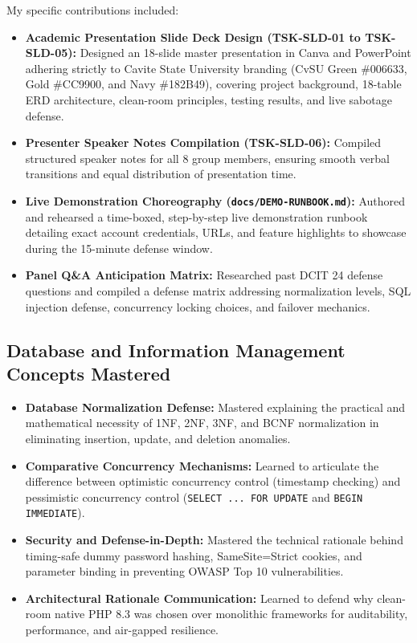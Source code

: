 My specific contributions included:
\begin{itemize}
    \item \textbf{Academic Presentation Slide Deck Design (TSK-SLD-01 to TSK-SLD-05):} Designed an 18-slide master presentation in Canva and PowerPoint adhering strictly to Cavite State University branding (CvSU Green \#006633, Gold \#CC9900, and Navy \#182B49), covering project background, 18-table ERD architecture, clean-room principles, testing results, and live sabotage defense.
    \item \textbf{Presenter Speaker Notes Compilation (TSK-SLD-06):} Compiled structured speaker notes for all 8 group members, ensuring smooth verbal transitions and equal distribution of presentation time.
    \item \textbf{Live Demonstration Choreography (\texttt{docs/DEMO-RUNBOOK.md}):} Authored and rehearsed a time-boxed, step-by-step live demonstration runbook detailing exact account credentials, URLs, and feature highlights to showcase during the 15-minute defense window.
    \item \textbf{Panel Q\&A Anticipation Matrix:} Researched past DCIT 24 defense questions and compiled a defense matrix addressing normalization levels, SQL injection defense, concurrency locking choices, and failover mechanics.
\end{itemize}

\subsection{Database and Information Management Concepts Mastered}
\begin{itemize}
    \item \textbf{Database Normalization Defense:} Mastered explaining the practical and mathematical necessity of 1NF, 2NF, 3NF, and BCNF normalization in eliminating insertion, update, and deletion anomalies.
    \item \textbf{Comparative Concurrency Mechanisms:} Learned to articulate the difference between optimistic concurrency control (timestamp checking) and pessimistic concurrency control (\texttt{SELECT ... FOR UPDATE} and \texttt{BEGIN IMMEDIATE}).
    \item \textbf{Security and Defense-in-Depth:} Mastered the technical rationale behind timing-safe dummy password hashing, SameSite=Strict cookies, and parameter binding in preventing OWASP Top 10 vulnerabilities.
    \item \textbf{Architectural Rationale Communication:} Learned to defend why clean-room native PHP 8.3 was chosen over monolithic frameworks for auditability, performance, and air-gapped resilience.
\end{itemize}

